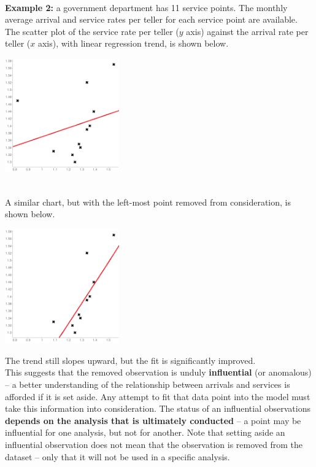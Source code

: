 \documentclass[20pt,landscape,footrule,headrule]{foils}
\newcommand{\newl}{\newline\newline}
\begin{document}
\newpage\ \\ \noindent \textbf{Example 2:} 
a government department has 11 service points. The monthly average arrival and service rates per teller for each service point are available. \newl The scatter plot of the service rate per teller ($y$ axis) against the arrival rate per teller ($x$ axis), with linear regression trend, is shown below. 

\begin{center}
\includegraphics[width=0.37\textwidth]{Images/scatter_plot_linear_1}
\end{center}
\newpage\ \\ \noindent 
A similar chart, but with the left-most point removed from consideration, is shown below. 
\begin{center}
\includegraphics[width=0.37\textwidth]{Images/scatter_plot_linear_2}
\end{center}
The trend still slopes upward, but the fit is significantly improved. \newpage\ \\ \noindent This suggests that the removed observation is unduly \textbf{influential} (or anomalous) -- a better understanding of the relationship between arrivals and services is afforded if it is set aside. 
\newl Any attempt to fit that data point into the model must take this information into consideration. \newl The status of an influential observations \textbf{depends on the analysis that is ultimately conducted} -- a point may be influential for one analysis, but not for another. 
\newl Note that setting aside an influential observation does not mean that the observation is removed from the dataset -- only that it will not be used in a specific analysis. 
\end{document}
